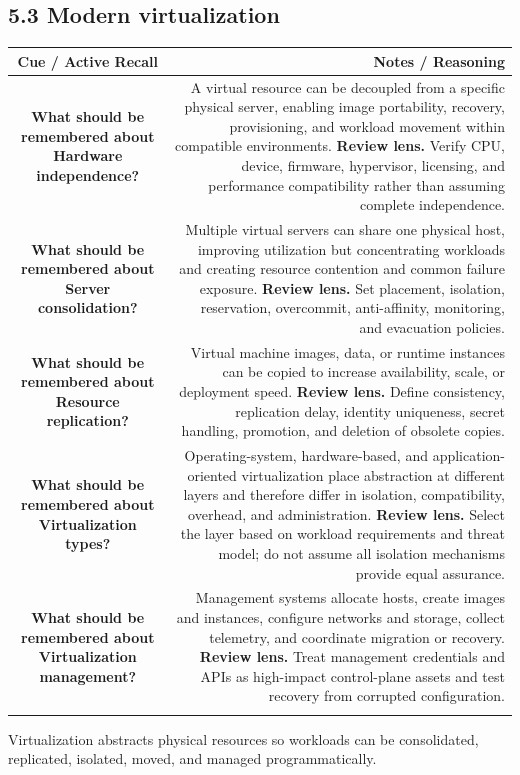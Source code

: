 \documentclass[11pt]{article}
\newcommand{\CornellHeader}{\rowcolor{Navy}\color{white}\bfseries Cue / Active Recall & \color{white}\bfseries Notes / Reasoning \\\endhead}
\newcommand{\CornellRow}[2]{\cellcolor{CueGray}\textbf{#1} & #2 \\\addlinespace[3pt]}
\begin{document}
\subsection{5.3 Modern virtualization}
\begin{longtable}{@{}C N@{}}
\CornellHeader
\CornellRow{What should be remembered about Hardware independence?}{A virtual resource can be decoupled from a specific physical server, enabling image portability, recovery, provisioning, and workload movement within compatible environments. \textbf{Review lens.} Verify CPU, device, firmware, hypervisor, licensing, and performance compatibility rather than assuming complete independence.}
\CornellRow{What should be remembered about Server consolidation?}{Multiple virtual servers can share one physical host, improving utilization but concentrating workloads and creating resource contention and common failure exposure. \textbf{Review lens.} Set placement, isolation, reservation, overcommit, anti-affinity, monitoring, and evacuation policies.}
\CornellRow{What should be remembered about Resource replication?}{Virtual machine images, data, or runtime instances can be copied to increase availability, scale, or deployment speed. \textbf{Review lens.} Define consistency, replication delay, identity uniqueness, secret handling, promotion, and deletion of obsolete copies.}
\CornellRow{What should be remembered about Virtualization types?}{Operating-system, hardware-based, and application-oriented virtualization place abstraction at different layers and therefore differ in isolation, compatibility, overhead, and administration. \textbf{Review lens.} Select the layer based on workload requirements and threat model; do not assume all isolation mechanisms provide equal assurance.}
\CornellRow{What should be remembered about Virtualization management?}{Management systems allocate hosts, create images and instances, configure networks and storage, collect telemetry, and coordinate migration or recovery. \textbf{Review lens.} Treat management credentials and APIs as high-impact control-plane assets and test recovery from corrupted configuration.}
\end{longtable}
\begin{sectionsummarybox}
Virtualization abstracts physical resources so workloads can be consolidated, replicated, isolated, moved, and managed programmatically.
\end{sectionsummarybox}
\end{document}
